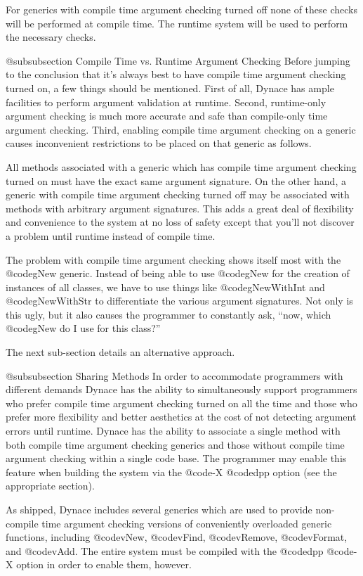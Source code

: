 For generics with compile time argument checking turned off none of
these checks will be performed at compile time.  The runtime system
will be used to perform the necessary checks.

@subsubsection Compile Time vs. Runtime Argument Checking
Before jumping to the conclusion that it's always best to have compile
time argument checking turned on, a few things should be mentioned.
First of all, Dynace has ample facilities to perform argument validation
at runtime.  Second, runtime-only argument checking is much more accurate
and safe than compile-only time argument checking.  Third, enabling
compile time argument checking on a generic causes inconvenient
restrictions to be placed on that generic as follows.

All methods associated with a generic which has compile time argument
checking turned on must have the exact same argument signature.  On the
other hand, a generic with compile time argument checking turned off
may be associated with methods with arbitrary argument signatures.
This adds a great deal of flexibility and convenience to the system
at no loss of safety except that you'll not discover a problem
until runtime instead of compile time.


The problem with compile time argument checking shows itself most with
the @code{gNew} generic.  Instead of being able to use @code{gNew}
for the creation of instances of all classes, we have to use things
like @code{gNewWithInt} and @code{gNewWithStr} to differentiate
the various argument signatures.  Not only is this ugly, but it also
causes the programmer to constantly ask, ``now, which @code{gNew} do
I use for this class?''

The next sub-section details an alternative approach.

@subsubsection Sharing Methods
In order to accommodate programmers with different demands Dynace has the
ability to simultaneously support programmers who prefer compile time
argument checking turned on all the time and those who prefer more
flexibility and better aesthetics at the cost of not detecting argument 
errors until runtime.  Dynace has the ability to associate a single
method with both compile time argument checking generics and those
without compile time argument checking within a single code base.  The
programmer may enable this feature when building the system via the
@code{-X} @code{dpp} option (see the appropriate section).

As shipped, Dynace includes several generics which are used to provide
non-compile time argument checking versions of conveniently overloaded
generic functions, including @code{vNew}, @code{vFind}, @code{vRemove},
@code{vFormat}, and @code{vAdd}.  The entire system must be compiled with
the @code{dpp} @code{-X} option in order to enable them, however.

